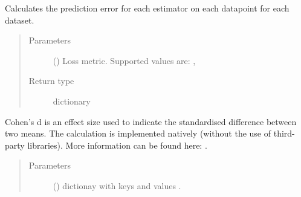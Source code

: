\documentclass[letterpaper,10pt,english]{sphinxmanual}
\begin{document}
\begin{fulllineitems}
\begin{fulllineitems}
\begin{quote}
\begin{description}
\end{description}\end{quote}

\end{fulllineitems}


\begin{fulllineitems}
\label{\detokenize{analyze_results:mleap.analyze_results.analyze_results.AnalyseResults.calculate_error_per_dataset}}
Calculates the prediction error for each estimator on each datapoint for each dataset.
\begin{quote}\begin{description}
\item[{Parameters}] \leavevmode
{} () \textendash{} Loss metric. Supported values are: ,  

\item[{Return type}] \leavevmode
dictionary

\end{description}\end{quote}

\end{fulllineitems}


\begin{fulllineitems}
\label{\detokenize{analyze_results:mleap.analyze_results.analyze_results.AnalyseResults.cohens_d}}
Cohen’s d is an effect size used to indicate the standardised difference
between two means. The calculation is implemented natively (without the 
use of third-party libraries). More information can be found here:
.
\begin{quote}\begin{description}
\item[{Parameters}] \leavevmode
{} () \textendash{} dictionay with keys  and 
values .


\end{description}
\end{quote}
\end{fulllineitems}
\end{fulllineitems}
\end{document}
